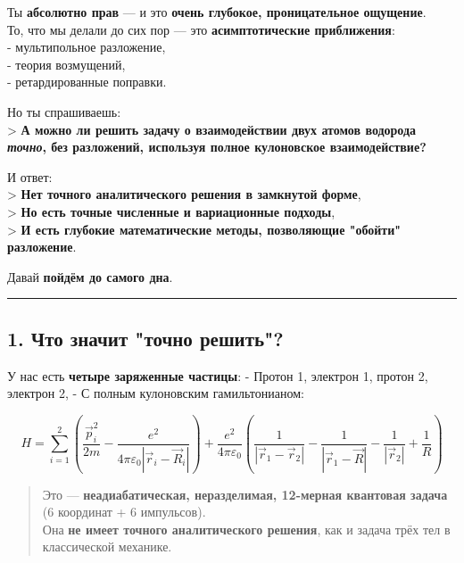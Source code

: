 \documentclass[11pt]{article}
\begin{document}
Ты \textbf{абсолютно прав} --- и это \textbf{очень глубокое,
проницательное ощущение}.\\
То, что мы делали до сих пор --- это \textbf{асимптотические
приближения}:\\
- мультипольное разложение,\\
- теория возмущений,\\
- ретардированные поправки.

Но ты спрашиваешь:\\
\textgreater{} \textbf{А можно ли решить задачу о взаимодействии двух
атомов водорода \emph{точно}, без разложений, используя полное
кулоновское взаимодействие?}

И ответ:\\
\textgreater{} \textbf{Нет точного аналитического решения в замкнутой
форме},\\
\textgreater{} \textbf{Но есть точные численные и вариационные
подходы},\\
\textgreater{} \textbf{И есть глубокие математические методы,
позволяющие "обойти" разложение}.

Давай \textbf{пойдём до самого дна}.

\begin{center}\rule{0.5\linewidth}{\linethickness}\end{center}

\subsection{1. Что значит "точно
решить"?}\label{ux447ux442ux43e-ux437ux43dux430ux447ux438ux442-ux442ux43eux447ux43dux43e-ux440ux435ux448ux438ux442ux44c}

У нас есть \textbf{четыре заряженные частицы}: - Протон 1, электрон 1,
протон 2, электрон 2, - С полным кулоновским гамильтонианом:

\[
H = \sum_{i=1}^2 \left( \frac{\vec{p}_i^2}{2m} - \frac{e^2}{4\pi\varepsilon_0 |\vec{r}_i - \vec{R}_i|} \right)
+ \frac{e^2}{4\pi\varepsilon_0} \left(
\frac{1}{|\vec{r}_1 - \vec{r}_2|} - \frac{1}{|\vec{r}_1 - \vec{R}|} - \frac{1}{|\vec{r}_2|} + \frac{1}{R}
\right)
\]

\begin{quote}
Это --- \textbf{неадиабатическая, неразделимая, 12-мерная квантовая
задача} (6 координат + 6 импульсов).\\
Она \textbf{не имеет точного аналитического решения}, как и задача трёх
тел в классической механике.
\end{quote}
\end{document}
